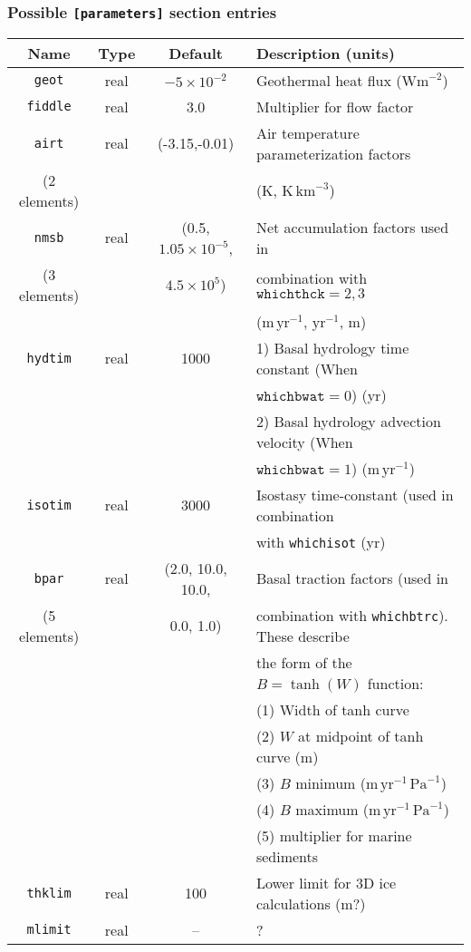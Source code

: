 \subsubsection{Possible \texttt{[parameters]} section entries}
%
\begin{center}
\begin{tabular}{|c|c|c|l|}
\hline
Name & Type & Default & Description (units)\\
\hline
\hline
\texttt{geot} & real & $-5\times 10^{-2}$ & Geothermal heat flux
($\mathrm{Wm}^{-2}$) \\
\hline
\texttt{fiddle} & real & 3.0 & Multiplier for flow factor \\
\hline
\texttt{airt} & real & (-3.15,-0.01) & Air temperature parameterization
factors \\
(2 elements)& & & (K, $\mathrm{K}\,\mathrm{km}^{-3}$) \\
\hline
\texttt{nmsb} & real & (0.5, $1.05\times 10^{-5}$,  & Net accumulation
factors used in \\
(3 elements) & & $4.5\times 10^{5}$) & combination with $\mathtt{whichthck}=2,3$ \\
 & & & ($\mathrm{m}\,\mathrm{yr}^{-1}$, $\mathrm{yr}^{-1}$, m) \\
\hline
\texttt{hydtim} & real & 1000 & 1) Basal hydrology time constant (When \\
 & & & $\mathtt{whichbwat}=0$) (yr)\\
 & & & 2) Basal hydrology advection velocity (When \\
 & & & $\mathtt{whichbwat}=1$) ($\mathrm{m}\,\mathrm{yr}^{-1}$)\\
\hline
\texttt{isotim} & real & 3000 & Isostasy time-constant (used in combination \\
 & & & with \texttt{whichisot} (yr) \\
\hline 
\texttt{bpar}  & real & (2.0, 10.0, 10.0, & Basal traction factors (used in \\
 (5 elements)& & 0.0, 1.0) & combination with \texttt{whichbtrc}). These describe \\
 & & & the form of the $B=\tanh(W)$ function: \\
 & & & (1) Width of tanh curve \\
 & & & (2) $W$ at midpoint of tanh curve (m) \\
 & & & (3) $B$ minimum ($\mathrm{m}\,\mathrm{yr}^{-1}\,\mathrm{Pa}^{-1}$) \\
 & & & (4) $B$ maximum ($\mathrm{m}\,\mathrm{yr}^{-1}\,\mathrm{Pa}^{-1}$) \\
 & & & (5) multiplier for marine sediments \\
\hline
\texttt{thklim} & real & 100 & Lower limit for 3D ice calculations (m?) \\
\hline
\texttt{mlimit} & real & -- & ? \\
\hline
\end{tabular}
\end{center}
%
